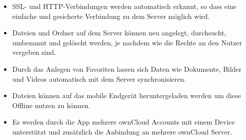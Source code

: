 \begin{itemize}

	\item SSL- und HTTP-Verbindungen werden automatisch erkannt, so dass eine einfache und gesicherte Verbindung zu dem Server möglich wird.\cite[]{WEB:OWNCLOUD:2014}

	\item Dateien und Ordner auf dem Server können neu angelegt, durchsucht, umbenannt und gelöscht werden, je nachdem wie die Rechte an den Nutzer vergeben sind.\cite[]{WEB:OWNCLOUD:2014}

	\item Durch das Anlegen von Favoriten lassen sich Daten wie Dokumente, Bilder und Videos automatisch mit dem Server synchronisieren.\cite[]{WEB:OWNCLOUD:2014}

	\item Dateien können auf das mobile Endgerät heruntergeladen werden um diese Offline nutzen zu können.\cite[]{WEB:OWNCLOUD:2014}

	\item Es werden durch die App mehrere ownCloud Accounts mit einem Device unterstützt und zusätzlich die Anbindung an mehrere ownCloud Server.\cite[]{WEB:OWNCLOUD:2014}

\end{itemize}

\hspace{2 cm}

